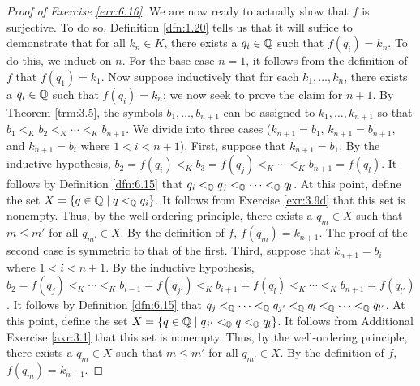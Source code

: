 \documentclass[../main.tex]{subfiles}
\begin{document}
\begin{exercise}
\begin{proof}[Proof of Exercise \ref{exr:6.16}]
        We are now ready to actually show that $f$ is surjective. To do so, Definition \ref{dfn:1.20} tells us that it will suffice to demonstrate that for all $k_n\in K$, there exists a $q_i\in\mathbb{Q}$ such that $f(q_i)=k_n$. To do this, we induct on $n$. For the base case $n=1$, it follows from the definition of $f$ that $f(q_1)=k_1$. Now suppose inductively that for each $k_1,\dots,k_n$, there exists a $q_i\in\mathbb{Q}$ such that $f(q_i)=k_n$; we now seek to prove the claim for $n+1$. By Theorem \ref{trm:3.5}, the symbols $b_1,\dots,b_{n+1}$ can be assigned to $k_1,\dots,k_{n+1}$ so that $b_1<_Kb_2<_K\cdots<_Kb_{n+1}$. We divide into three cases ($k_{n+1}=b_1$, $k_{n+1}=b_{n+1}$, and $k_{n+1}=b_i$ where $1<i<n+1$). First, suppose that $k_{n+1}=b_1$. By the inductive hypothesis, $b_2=f(q_i)<_Kb_3=f(q_j)<_K\cdots<_Kb_{n+1}=f(q_l)$. It follows by Definition \ref{dfn:6.15} that $q_i<_{\mathbb{Q}} q_j<_{\mathbb{Q}} \cdots<_{\mathbb{Q}} q_l$. At this point, define the set $X=\{q\in\mathbb{Q}\mid q<_{\mathbb{Q}} q_i\}$. It follows from Exercise \ref{exr:3.9d} that this set is nonempty. Thus, by the well-ordering principle, there exists a $q_m\in X$ such that $m\leq m'$ for all $q_{m'}\in X$. By the definition of $f$, $f(q_m)=k_{n+1}$. The proof of the second case is symmetric to that of the first. Third, suppose that $k_{n+1}=b_i$ where $1<i<n+1$. By the inductive hypothesis, $b_2=f(q_j)<_K\cdots<_Kb_{i-1}=f(q_{j'})<_Kb_{i+1}=f(q_l)<_K\cdots<_Kb_{n+1}=f(q_{l'})$. It follows by Definition \ref{dfn:6.15} that $q_j<_{\mathbb{Q}} \cdots<_{\mathbb{Q}} q_{j'}<_{\mathbb{Q}} q_l<_{\mathbb{Q}}\cdots<_{\mathbb{Q}} q_{l'}$. At this point, define the set $X=\{q\in\mathbb{Q}\mid q_{j'}<_{\mathbb{Q}} q<_{\mathbb{Q}} q_l\}$. It follows from Additional Exercise \ref{axr:3.1} that this set is nonempty. Thus, by the well-ordering principle, there exists a $q_m\in X$ such that $m\leq m'$ for all $q_{m'}\in X$. By the definition of $f$, $f(q_m)=k_{n+1}$.
    \end{proof}
\end{exercise}
\end{document}
